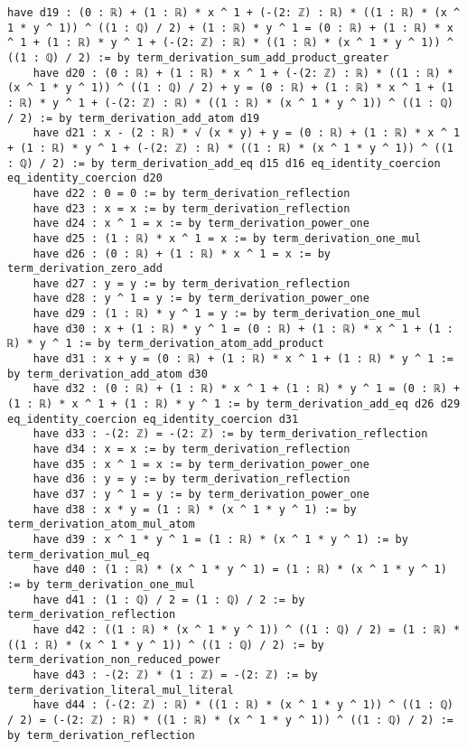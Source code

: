 \documentclass{article}
\begin{document}
\begin{tcolorbox}[colback=white!10, width=\linewidth]
\begin{lstlisting}[language=Lean4]
    have d19 : (0 : ℝ) + (1 : ℝ) * x ^ 1 + (-(2: ℤ) : ℝ) * ((1 : ℝ) * (x ^ 1 * y ^ 1)) ^ ((1 : ℚ) / 2) + (1 : ℝ) * y ^ 1 = (0 : ℝ) + (1 : ℝ) * x ^ 1 + (1 : ℝ) * y ^ 1 + (-(2: ℤ) : ℝ) * ((1 : ℝ) * (x ^ 1 * y ^ 1)) ^ ((1 : ℚ) / 2) := by term_derivation_sum_add_product_greater
    have d20 : (0 : ℝ) + (1 : ℝ) * x ^ 1 + (-(2: ℤ) : ℝ) * ((1 : ℝ) * (x ^ 1 * y ^ 1)) ^ ((1 : ℚ) / 2) + y = (0 : ℝ) + (1 : ℝ) * x ^ 1 + (1 : ℝ) * y ^ 1 + (-(2: ℤ) : ℝ) * ((1 : ℝ) * (x ^ 1 * y ^ 1)) ^ ((1 : ℚ) / 2) := by term_derivation_add_atom d19
    have d21 : x - (2 : ℝ) * √ (x * y) + y = (0 : ℝ) + (1 : ℝ) * x ^ 1 + (1 : ℝ) * y ^ 1 + (-(2: ℤ) : ℝ) * ((1 : ℝ) * (x ^ 1 * y ^ 1)) ^ ((1 : ℚ) / 2) := by term_derivation_add_eq d15 d16 eq_identity_coercion eq_identity_coercion d20
    have d22 : 0 = 0 := by term_derivation_reflection
    have d23 : x = x := by term_derivation_reflection
    have d24 : x ^ 1 = x := by term_derivation_power_one
    have d25 : (1 : ℝ) * x ^ 1 = x := by term_derivation_one_mul
    have d26 : (0 : ℝ) + (1 : ℝ) * x ^ 1 = x := by term_derivation_zero_add
    have d27 : y = y := by term_derivation_reflection
    have d28 : y ^ 1 = y := by term_derivation_power_one
    have d29 : (1 : ℝ) * y ^ 1 = y := by term_derivation_one_mul
    have d30 : x + (1 : ℝ) * y ^ 1 = (0 : ℝ) + (1 : ℝ) * x ^ 1 + (1 : ℝ) * y ^ 1 := by term_derivation_atom_add_product
    have d31 : x + y = (0 : ℝ) + (1 : ℝ) * x ^ 1 + (1 : ℝ) * y ^ 1 := by term_derivation_add_atom d30
    have d32 : (0 : ℝ) + (1 : ℝ) * x ^ 1 + (1 : ℝ) * y ^ 1 = (0 : ℝ) + (1 : ℝ) * x ^ 1 + (1 : ℝ) * y ^ 1 := by term_derivation_add_eq d26 d29 eq_identity_coercion eq_identity_coercion d31
    have d33 : -(2: ℤ) = -(2: ℤ) := by term_derivation_reflection
    have d34 : x = x := by term_derivation_reflection
    have d35 : x ^ 1 = x := by term_derivation_power_one
    have d36 : y = y := by term_derivation_reflection
    have d37 : y ^ 1 = y := by term_derivation_power_one
    have d38 : x * y = (1 : ℝ) * (x ^ 1 * y ^ 1) := by term_derivation_atom_mul_atom
    have d39 : x ^ 1 * y ^ 1 = (1 : ℝ) * (x ^ 1 * y ^ 1) := by term_derivation_mul_eq
    have d40 : (1 : ℝ) * (x ^ 1 * y ^ 1) = (1 : ℝ) * (x ^ 1 * y ^ 1) := by term_derivation_one_mul
    have d41 : (1 : ℚ) / 2 = (1 : ℚ) / 2 := by term_derivation_reflection
    have d42 : ((1 : ℝ) * (x ^ 1 * y ^ 1)) ^ ((1 : ℚ) / 2) = (1 : ℝ) * ((1 : ℝ) * (x ^ 1 * y ^ 1)) ^ ((1 : ℚ) / 2) := by term_derivation_non_reduced_power
    have d43 : -(2: ℤ) * (1 : ℤ) = -(2: ℤ) := by term_derivation_literal_mul_literal
    have d44 : (-(2: ℤ) : ℝ) * ((1 : ℝ) * (x ^ 1 * y ^ 1)) ^ ((1 : ℚ) / 2) = (-(2: ℤ) : ℝ) * ((1 : ℝ) * (x ^ 1 * y ^ 1)) ^ ((1 : ℚ) / 2) := by term_derivation_reflection

\end{lstlisting}
\end{tcolorbox}
\end{document}
